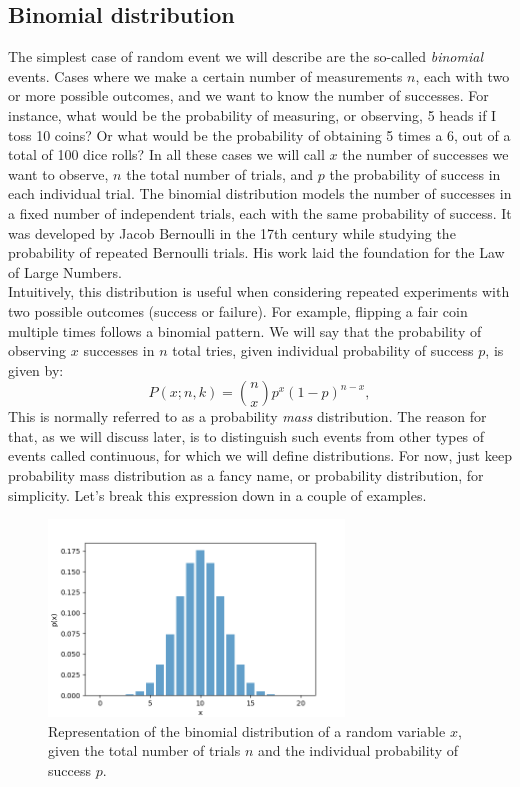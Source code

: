 \documentclass{book}
\begin{document}
\subsection{Binomial distribution}
The simplest case of random event we will describe are the so-called \textit{binomial} events. Cases where we make a certain number of measurements $n$, each with two or more possible outcomes, and we want to know the number of successes. For instance, what would be the probability of measuring, or observing, 5 heads if I toss 10 coins? Or what would be the probability of obtaining 5 times a 6, out of a total of 100 dice rolls? In all these cases we will call $x$ the number of successes we want to observe, $n$ the total number of trials, and $p$ the probability of success in each individual trial. The binomial distribution models the number of successes in a fixed number of independent trials, each with the same probability of success. It was developed by Jacob Bernoulli in the 17th century while studying the probability of repeated Bernoulli trials. His work laid the foundation for the Law of Large Numbers.\\

Intuitively, this distribution is useful when considering repeated experiments with two possible outcomes (success or failure). For example, flipping a fair coin multiple times follows a binomial pattern. We will say that the probability of observing $x$ successes in $n$ total tries, given individual probability of success $p$, is given by:
\begin{equation}
    P(x; n, k) = \binom{n}{x} p^x (1-p)^{n-x},
\end{equation}
This is normally referred to as a probability \textit{mass} distribution. The reason for that, as we will discuss later, is to distinguish such events from other types of events called continuous, for which we will define  distributions. For now, just keep probability mass distribution as a fancy name, or probability distribution, for simplicity. Let's break this expression down in a couple of examples.

\begin{figure}[ht]
    \centering
    \includegraphics[width=0.7\textwidth]{figures/chapter2/binomial.png}
    \caption{Representation of the binomial distribution of a random variable $x$, given the total number of trials $n$ and the individual probability of success $p$.}
    \label{fig:random}
\end{figure}
\end{document}
